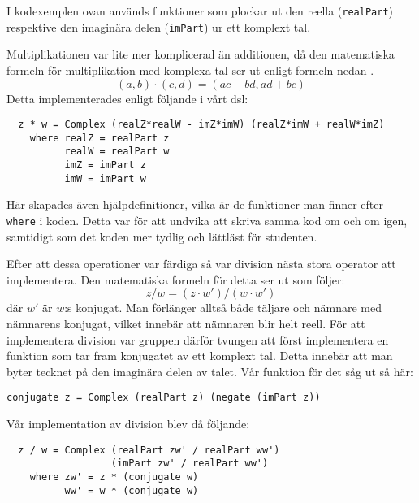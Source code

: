 \documentclass[12pt,a4paper,twoside,openright]{article}
\begin{document}
I kodexemplen ovan används funktioner som plockar ut den reella
(\texttt{realPart}) respektive den imaginära delen
(\texttt{imPart}) ur ett komplext tal.

Multiplikationen var lite mer komplicerad än additionen, då den
matematiska formeln för multiplikation med komplexa tal ser ut enligt
formeln nedan \cite{conway1978functions}.
\[(a, b) \cdot (c, d) = (ac - bd, ad + bc) \]
Detta implementerades enligt följande i vårt \gls{dsl}:
\begin{verbatim}
  z * w = Complex (realZ*realW - imZ*imW) (realZ*imW + realW*imZ)
    where realZ = realPart z
          realW = realPart w
          imZ = imPart z
          imW = imPart w
\end{verbatim}

Här skapades även hjälpdefinitioner, vilka är de funktioner man finner
efter \texttt{where} i koden. Detta var för att undvika
att skriva samma kod om och om igen, samtidigt som det koden mer
tydlig och lättläst för studenten.

Efter att dessa operationer var färdiga så var division nästa stora
operator att implementera. Den matematiska formeln för detta ser ut
som följer:
\[ z / w = (z \cdot w') / (w \cdot w') \]
där \(w'\) är \(w\):s konjugat.
Man förlänger alltså både täljare och nämnare med nämnarens konjugat,
vilket innebär att nämnaren blir helt reell. För att implementera
division var gruppen därför tvungen att först implementera en funktion
som tar fram konjugatet av ett komplext tal. Detta innebär att man
byter tecknet på den imaginära delen av talet. Vår funktion för det
såg ut så här:

\begin{verbatim}
conjugate z = Complex (realPart z) (negate (imPart z))
\end{verbatim}
Vår implementation av division blev då följande:

\begin{verbatim}
  z / w = Complex (realPart zw' / realPart ww')
                  (imPart zw' / realPart ww')
    where zw' = z * (conjugate w)
          ww' = w * (conjugate w)
\end{verbatim}
\end{document}
